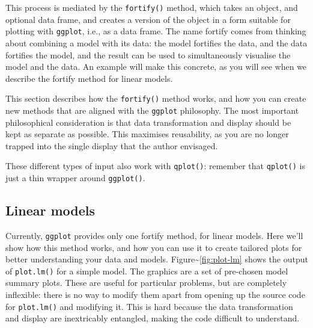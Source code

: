 This process is mediated by the \texttt{fortify()} method, which takes
an object, and optional data frame, and creates a version of the object
in a form suitable for plotting with \texttt{ggplot}, i.e., as a data
frame. The name fortify comes from thinking about combining a model with
its data: the model fortifies the data, and the data fortifies the
model, and the result can be used to simultaneously visualise the model
and the data. An example will make this concrete, as you will see when
we describe the fortify method for linear models. 

This section describes how the \texttt{fortify()} method works, and how
you can create new methods that are aligned with the \texttt{ggplot}
philosophy. The most important philosophical consideration is that data
transformation and display should be kept as separate as possible. This
maximises reusability, as you are no longer trapped into the single
display that the author envisaged.

These different types of input also work with \texttt{qplot()}: remember
that \texttt{qplot()} is just a thin wrapper around \texttt{ggplot()}.

\subsection{Linear models}

Currently, \texttt{ggplot} provides only one fortify method, for linear
models. Here we'll show how this method works, and how you can use it to
create tailored plots for better understanding your data and models.
Figure\textasciitilde{}\ref{fig:plot-lm} shows the output of
\texttt{plot.lm()} for a simple model. The graphics are a set of
pre-chosen model summary plots. These are useful for particular
problems, but are completely inflexible: there is no way to modify them
apart from opening up the source code for \texttt{plot.lm()} and
modifying it. This is hard because the data transformation and display
are inextricably entangled, making the code difficult to understand.
  

\begin{Shaded}
\begin{Highlighting}[]
\StringTok{ }\StringTok{ } 
\end{Highlighting}
\end{Shaded}

